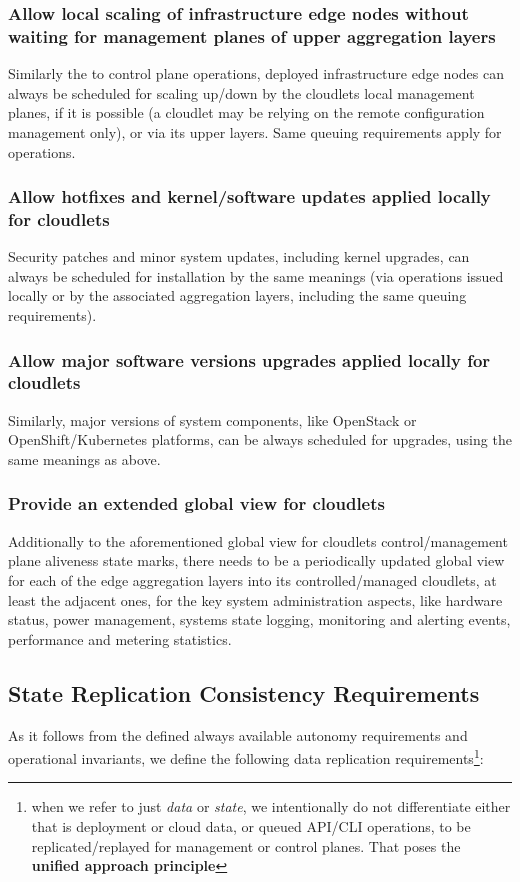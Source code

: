 \documentclass[conference]{IEEEtran}
\begin{document}
\subsubsection{Allow local scaling of infrastructure edge nodes without waiting
for management planes of upper aggregation layers}
Similarly the to control plane operations, deployed infrastructure edge nodes
can always be scheduled for scaling up/down by the cloudlets local management
planes, if it is possible (a cloudlet may be relying on the remote
configuration management only), or via its upper layers. Same queuing
requirements apply for operations.

\subsubsection{Allow hotfixes and kernel/software updates applied locally for
cloudlets}
Security patches and minor system updates, including kernel upgrades, can
always be scheduled for installation by the same meanings (via operations
issued locally or by the associated aggregation layers, including the same
queuing requirements).

\subsubsection{Allow major software versions upgrades applied locally for
cloudlets}
Similarly, major versions of system components, like OpenStack or
OpenShift/Kubernetes platforms, can be always scheduled for upgrades, using the
same meanings as above.

\subsubsection{Provide an extended global view for cloudlets}
Additionally to the aforementioned global view for cloudlets control/management
plane aliveness state marks, there needs to be a periodically updated global
view for each of the edge aggregation layers into its controlled/managed
cloudlets, at least the adjacent ones, for the key system administration
aspects, like hardware status, power management, systems state logging,
monitoring and alerting events, performance and metering statistics.

\subsection{State Replication Consistency Requirements}
As it follows from the defined always available autonomy requirements and
operational invariants, we define the following data replication
requirements\footnote{when we refer to just \textit{data} or \textit{state}, we
intentionally do not differentiate either that is deployment or cloud data, or
queued API/CLI operations, to be replicated/replayed for management or control
planes. That poses the \textbf{unified approach principle}}:
\end{document}
